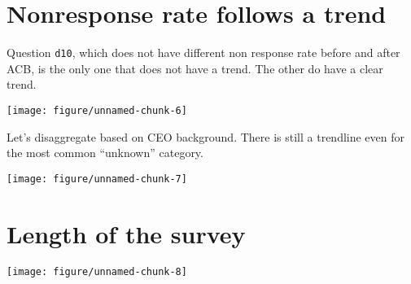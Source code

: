 \documentclass{article}\usepackage[]{graphicx}\usepackage[]{color}
\makeatletter
\def\maxwidth{ %
  \ifdim\Gin@nat@width>\linewidth
    \linewidth
  \else
    \Gin@nat@width
  \fi
}
\newenvironment{kframe}{%
 \def\at@end@of@kframe{}%
 \ifinner\ifhmode%
  \def\at@end@of@kframe{\end{minipage}}%
  \begin{minipage}{\columnwidth}%
 \fi\fi%
 \def\FrameCommand##1{\hskip\@totalleftmargin \hskip-\fboxsep
 \colorbox{shadecolor}{##1}\hskip-\fboxsep
     \hskip-\linewidth \hskip-\@totalleftmargin \hskip\columnwidth}%
 \MakeFramed {\advance\hsize-\width
   \@totalleftmargin\z@ \linewidth\hsize
   \@setminipage}}%
 {\par\unskip\endMakeFramed%
 \at@end@of@kframe}
\newenvironment{knitrout}{}{} %
\makeatother
\begin{document}
\section{Nonresponse rate follows a trend}

Question \verb`d10`, which does not have different non response rate before and after ACB, is the only one that does not have a trend. The other do have a clear trend.

\begin{knitrout}
\color{fgcolor}

{\centering \texttt{[image: figure/unnamed-chunk-6]} 

}



\end{knitrout}

Let's disaggregate based on CEO background. There is still a trendline even for the most common ``unknown'' category.

\begin{knitrout}
\color{fgcolor}

{\centering \texttt{[image: figure/unnamed-chunk-7]} 

}



\end{knitrout}

\section{Length of the survey}

\begin{knitrout}
\color{fgcolor}\begin{kframe}


{\ttfamily\noindent\color{warningcolor}{\#\# Warning: attributes are not identical across measure variables; they will be dropped}}\end{kframe}

{\centering \texttt{[image: figure/unnamed-chunk-8]} 

}



\end{knitrout}
\end{document}
